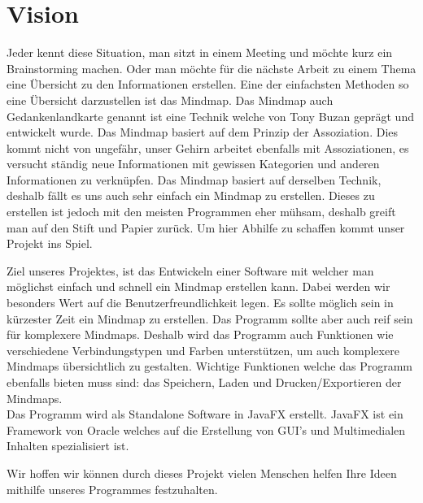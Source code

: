 \chapter{Vision}
\label{chap:vision}

Jeder kennt diese Situation, man sitzt in einem Meeting und möchte kurz ein Brainstorming machen. Oder man möchte für die nächste Arbeit zu einem Thema eine Übersicht zu den Informationen erstellen. Eine der einfachsten Methoden so eine Übersicht darzustellen ist das Mindmap. Das Mindmap auch Gedankenlandkarte genannt ist eine Technik welche von Tony Buzan geprägt und entwickelt wurde. Das Mindmap basiert auf dem Prinzip der Assoziation. Dies kommt nicht von ungefähr, unser Gehirn arbeitet ebenfalls mit Assoziationen, es versucht ständig neue Informationen mit gewissen Kategorien und anderen Informationen zu verknüpfen. Das Mindmap basiert auf derselben Technik, deshalb fällt es uns auch sehr einfach ein Mindmap zu erstellen. Dieses zu erstellen ist jedoch mit den meisten Programmen eher mühsam, deshalb greift man auf den Stift und Papier zurück. Um hier Abhilfe zu schaffen kommt unser Projekt ins Spiel.

Ziel unseres Projektes, ist das Entwickeln einer Software mit welcher man möglichst einfach und schnell ein Mindmap erstellen kann. Dabei werden wir besonders Wert auf die Benutzerfreundlichkeit legen. Es sollte möglich sein in kürzester Zeit ein Mindmap zu erstellen. Das Programm sollte aber auch reif sein für komplexere Mindmaps. Deshalb wird das Programm auch Funktionen wie verschiedene Verbindungstypen und Farben unterstützen, um auch komplexere Mindmaps übersichtlich zu gestalten. Wichtige Funktionen welche das Programm ebenfalls bieten muss sind: das Speichern, Laden und Drucken/Exportieren der Mindmaps.\\
Das Programm wird als Standalone Software in JavaFX erstellt. JavaFX ist ein Framework von Oracle welches auf die Erstellung von GUI's und Multimedialen Inhalten spezialisiert ist.

Wir hoffen wir können durch dieses Projekt vielen Menschen helfen Ihre Ideen mithilfe unseres Programmes festzuhalten.
